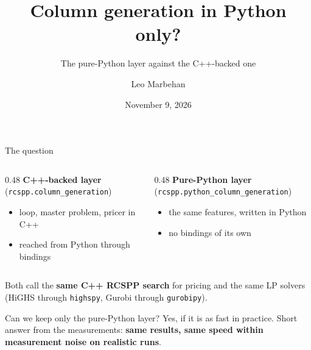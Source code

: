 \documentclass[aspectratio=169]{beamer}
\title{Column generation in Python only?}
\subtitle{The pure-Python layer against the C++-backed one}
\author{Leo Marbehan}
\date{November 9, 2026}
\begin{document}
\begin{frame}[plain]
  \titlepage
\end{frame}

\begin{frame}{The question}
  \begin{columns}[T]
    \begin{column}{0.48\textwidth}
      \textbf{C++-backed layer} (\texttt{rcspp.column\_generation})
      \begin{itemize}\small
        \item loop, master problem, pricer in C++
        \item reached from Python through bindings
      \end{itemize}
    \end{column}
    \begin{column}{0.48\textwidth}
      \textbf{Pure-Python layer} (\texttt{rcspp.python\_column\_generation})
      \begin{itemize}\small
        \item the same features, written in Python
        \item no bindings of its own
      \end{itemize}
    \end{column}
  \end{columns}

  \vspace{0.6em}
  Both call the \textbf{same C++ RCSPP search} for pricing and the same LP solvers (HiGHS through
  \texttt{highspy}, Gurobi through \texttt{gurobipy}).

  \vspace{0.8em}
  \begin{block}{Can we keep only the pure-Python layer?}
    Yes, if it is as fast in practice. Short answer from the measurements:
    \textbf{same results, same speed within measurement noise on realistic runs}.
  \end{block}
\end{frame}
\end{document}
